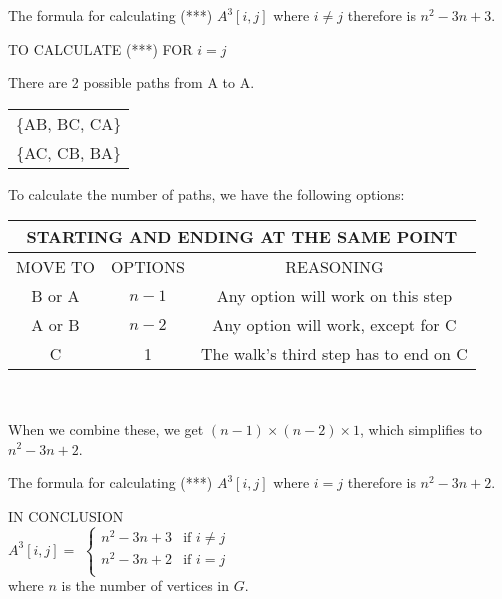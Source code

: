 \documentclass[12pt]{article}
\begin{document}
The formula for calculating (***) $A^{3}[i, j]$ where $i \neq j$ therefore is $n^{2} -3n + 3$.

\begin{center}
\Large TO CALCULATE (***) FOR $i = j$
\end{center}
\normalsize

There are 2 possible paths from A to A. \\
\begin{center}
\begin{tabular}{|c|}  \hline
\{AB, BC, CA\} \\
\{AC, CB, BA\} \\ \hline
\end{tabular}
\end{center}

To calculate the number of paths, we have the following options: \\
\begin{center}
\begin{tabular}{|c|c|c|}
\multicolumn{3}{c}{STARTING AND ENDING AT THE SAME POINT}  \\ \hline
MOVE TO & OPTIONS & REASONING \\ \hline
B or A & $n-1$ & Any option will work on this step \\ \hline
A or B &$n-2$ & Any option will work, except for C \\ \hline
C & 1 & The walk's third step has to end on C \\ \hline
\end{tabular} \\
\end{center}

When we combine these, we get $(n-1) \times (n-2) \times 1$, which simplifies to $n^{2} -3n + 2$.

The formula for calculating (***) $A^{3}[i, j]$ where $i = j$ therefore is $n^{2} -3n + 2$.

\begin{center}
\Large IN CONCLUSION \\

\normalsize
$ A^{3}[i,j] = $ 
    $\begin{cases} n^{2} -3n + 3  & \mbox{if } i \neq  j  \\  n^{2} -3n + 2   & \mbox{if } i =j \\   \end{cases}$ \\
    where $n$ is the number of vertices in $G$.
\end{center}
\end{document}
